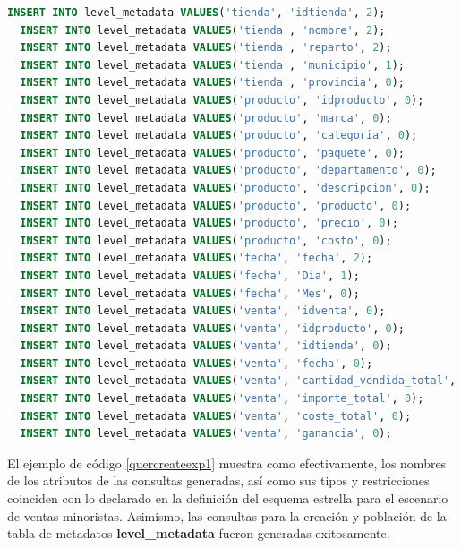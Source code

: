 \begin{lstlisting}[label={quercreateexp1}, caption={Consultas de creaci\'on generadas para el experimento 1}, language={sql}]
  INSERT INTO level_metadata VALUES('tienda', 'idtienda', 2);
  INSERT INTO level_metadata VALUES('tienda', 'nombre', 2);
  INSERT INTO level_metadata VALUES('tienda', 'reparto', 2);
  INSERT INTO level_metadata VALUES('tienda', 'municipio', 1);
  INSERT INTO level_metadata VALUES('tienda', 'provincia', 0);
  INSERT INTO level_metadata VALUES('producto', 'idproducto', 0);
  INSERT INTO level_metadata VALUES('producto', 'marca', 0);
  INSERT INTO level_metadata VALUES('producto', 'categoria', 0);
  INSERT INTO level_metadata VALUES('producto', 'paquete', 0);
  INSERT INTO level_metadata VALUES('producto', 'departamento', 0);
  INSERT INTO level_metadata VALUES('producto', 'descripcion', 0);
  INSERT INTO level_metadata VALUES('producto', 'producto', 0);
  INSERT INTO level_metadata VALUES('producto', 'precio', 0);
  INSERT INTO level_metadata VALUES('producto', 'costo', 0);
  INSERT INTO level_metadata VALUES('fecha', 'fecha', 2);
  INSERT INTO level_metadata VALUES('fecha', 'Dia', 1);
  INSERT INTO level_metadata VALUES('fecha', 'Mes', 0);
  INSERT INTO level_metadata VALUES('venta', 'idventa', 0);
  INSERT INTO level_metadata VALUES('venta', 'idproducto', 0);
  INSERT INTO level_metadata VALUES('venta', 'idtienda', 0);
  INSERT INTO level_metadata VALUES('venta', 'fecha', 0);
  INSERT INTO level_metadata VALUES('venta', 'cantidad_vendida_total', 0);
  INSERT INTO level_metadata VALUES('venta', 'importe_total', 0);
  INSERT INTO level_metadata VALUES('venta', 'coste_total', 0);
  INSERT INTO level_metadata VALUES('venta', 'ganancia', 0);
\end{lstlisting}

El ejemplo de c\'odigo \ref{quercreateexp1} muestra como efectivamente, los nombres de los atributos 
de las consultas generadas, as\'i como sus tipos y restricciones coinciden con lo declarado en la definición 
del esquema estrella para el escenario de ventas minoristas. Asimismo, las consultas para la creación y 
población de la tabla de metadatos \textbf{level\_metadata} fueron generadas exitosamente.

